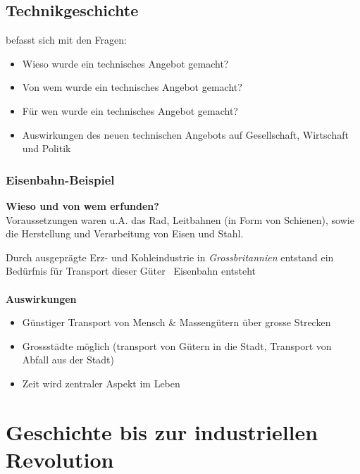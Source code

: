 \documentclass{report}
\begin{document}
\section{Technikgeschichte}
befasst sich mit den Fragen:
\begin{itemize}
	\item Wieso wurde ein technisches Angebot gemacht?
	\item Von wem wurde ein technisches Angebot gemacht?
	\item Für wen wurde ein technisches Angebot gemacht?
	\item Auswirkungen des neuen technischen Angebots auf Gesellschaft, Wirtschaft und Politik
\end{itemize}

\subsection{Eisenbahn-Beispiel}
\textbf{Wieso und von wem erfunden?}\\
Voraussetzungen waren u.A. das Rad, Leitbahnen (in Form von Schienen), sowie die Herstellung und Verarbeitung von Eisen und Stahl.\par
Durch ausgeprägte Erz- und Kohleindustrie in \textit{Grossbritannien} entstand ein Bedürfnis für Transport dieser Güter \arrow~Eisenbahn entsteht\\\\
\textbf{Auswirkungen}
\begin{itemize}
	\item Günstiger Transport von Mensch \& Massengütern über grosse Strecken
	\item Grossstädte möglich (transport von Gütern in die Stadt, Transport von Abfall aus der Stadt)
	\item Zeit wird zentraler Aspekt im Leben
\end{itemize}

\newpage

\chapter{Geschichte bis zur industriellen Revolution}
\end{document}
